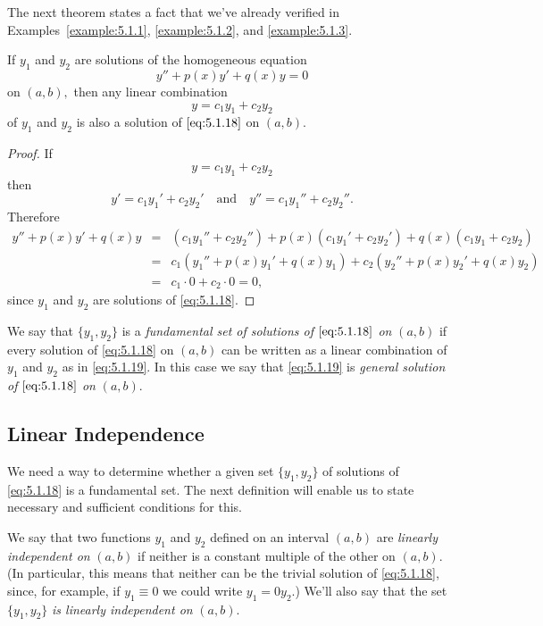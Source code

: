\documentclass{ximera}
\begin{document}
The next theorem states a fact that we've already verified in
Examples~\ref{example:5.1.1}, \ref{example:5.1.2}, and \ref{example:5.1.3}.
 
\begin{theorem}\label{thmtype:5.1.2}
If $y_1$ and $y_2$ are solutions of the homogeneous equation
\begin{equation}\label{eq:5.1.18}
y''+p(x)y'+q(x)y=0
\end{equation}
on $(a,b),$ then any linear combination
\begin{equation}\label{eq:5.1.19}
y=c_1y_1+c_2y_2
\end{equation}
of $y_1$ and $y_2$ is also a solution of $\eqref{eq:5.1.18}$ on $(a,b).$
\end{theorem}
 
\begin{proof}
 If
$$
y=c_1y_1+c_2y_2
$$
 then
$$
y'=c_1y_1'+c_2y_2'\quad\mbox{and}\quad y''=c_1y_1''+c_2y_2''.
$$
Therefore
\begin{eqnarray*}
y''+p(x)y'+q(x)y&=&(c_1y_1''+c_2y_2'')+p(x)(c_1y_1'+c_2y_2')
+q(x)(c_1y_1+c_2y_2)\\
&=&c_1\left(y_1''+p(x)y_1'+q(x)y_1\right)
+c_2\left(y_2''+p(x)y_2'+q(x)y_2\right)\\
&=&c_1\cdot0+c_2\cdot0=0,
\end{eqnarray*}
since $y_1$ and $y_2$ are solutions of \eqref{eq:5.1.18}. 
\end{proof}
We say that  $\{y_1,y_2\}$ is a \textit{fundamental set of
solutions of $\eqref{eq:5.1.18}$ on}  $(a,b)$ if every solution
of \eqref{eq:5.1.18} on  $(a,b)$ can be written as a linear
combination of $y_1$ and $y_2$ as in \eqref{eq:5.1.19}.
In this case we say that \eqref{eq:5.1.19} is
\textit{general solution of $\eqref{eq:5.1.18}$ on}  $(a,b)$.
 
\subsection*{Linear Independence}
 
We need a way to determine whether a given set $\{y_1,y_2\}$
of solutions of \eqref{eq:5.1.18}  is a fundamental set.
The next definition will enable us to state necessary and
sufficient conditions for this.
 
We say that two functions $y_1$ and $y_2$ defined on an interval
$(a,b)$ are \textit{linearly independent on} $(a,b)$ if neither is a
constant multiple of the other on $(a,b)$. (In
particular, this means
that neither can be the trivial solution of \eqref{eq:5.1.18}, since, for
example, if $y_1\equiv0$  we could write $y_1=0y_2$.) We'll also
say that the set $\{y_1,y_2\}$ \textit{is linearly independent on}
$(a,b)$.
 
\end{document}
